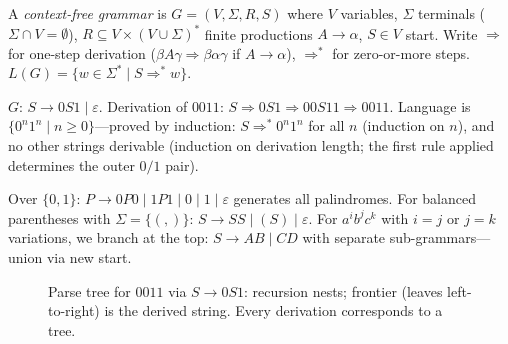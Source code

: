 \begin{definition}[CFG]
A \emph{context-free grammar} is $G=(V,\Sigma,R,S)$ where $V$ variables, $\Sigma$ terminals ($\Sigma\cap V=\emptyset$), $R\subseteq V\times(V\cup\Sigma)^*$ finite productions $A\to\alpha$, $S\in V$ start. Write $\Rightarrow$ for one-step derivation ($\beta A\gamma\Rightarrow\beta\alpha\gamma$ if $A\to\alpha$), $\Rightarrow^*$ for zero-or-more steps. $L(G)=\{w\in\Sigma^*\mid S\Rightarrow^*w\}$.
\end{definition}

\begin{example}
$G$: $S\to0S1\mid\varepsilon$. Derivation of $0011$: $S\Rightarrow0S1\Rightarrow00S11\Rightarrow0011$. Language is $\{0^n1^n\mid n\ge0\}$---proved by induction: $S\Rightarrow^*0^n1^n$ for all $n$ (induction on $n$), and no other strings derivable (induction on derivation length; the first rule applied determines the outer $0/1$ pair).
\end{example}

\begin{example}
Over $\{0,1\}$: $P\to0P0\mid1P1\mid0\mid1\mid\varepsilon$ generates all palindromes. For balanced parentheses with $\Sigma=\{(,)\}$: $S\to SS\mid(S)\mid\varepsilon$. For $a^ib^jc^k$ with $i=j$ or $j=k$ variations, we branch at the top: $S\to AB\mid CD$ with separate sub-grammars---union via new start.
\end{example}

\begin{figure}[h]
\centering
{}
\caption{Parse tree for $0011$ via $S\to0S1$: recursion nests; frontier (leaves left-to-right) is the derived string. Every derivation corresponds to a tree.}
\label{fig:parse-tree-0n1n}
\end{figure}

